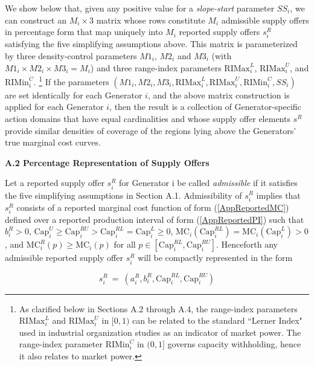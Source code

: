 \documentclass[12pt]{article}
\begin{document}
We show below that, given any positive value for a \textit{slope-start\/} parameter $SS_i$, we can construct 
an $M_i\times 3$ matrix whose rows constitute $M_i$ admissible supply offers in percentage form that map 
uniquely into $M_i$ reported supply offers $s^R_i$ satisfying the five simplifying assumptions above.  This matrix is parameterized by three density-control parameters $M1_i$, $M2_i$ and $M3_i$ (with $M1_i\times M2_i \times M3_i = M_i$) and three range-index parameters $\mbox{RIMax}^L_i$, $\mbox{RIMax}^U_i$, and $\mbox{RIMin}^C_i$.%
     \footnote{As clarified below in Sections A.2 through A.4, the range-index parameters $\mbox{RIMax}^L_i$  
and $\mbox{RIMax}^U_i$ in $[0,1)$ can be related to the standard ``Lerner Index" used in industrial organization studies as an indicator of market power.  The range-index parameter $\mbox{RIMin}^C_i$ in $(0,1]$ governs capacity withholding, hence it also relates to market power.} 
     If the parameters $(M1_i,M2_i,M3_i,\mbox{RIMax}^L_i,\mbox{RIMax}^U_i,\mbox{RIMin}^C_i,SS_i)$ are set identically for each Generator $i$, and the above matrix construction is applied for each Generator $i$, then the result is a collection of Generator-specific action domains that have equal cardinalities and whose supply offer elements $s^R$ provide similar densities of coverage of the regions lying above the Generators' true marginal cost curves.  


\bigskip
\noindent
\textbf{\large A.2 Percentage Representation of Supply Offers}

\medskip
\noindent

 
Let a reported supply offer $s^R_i$ for Generator i be called \textit{admissible\/} if it satisfies the five simplifying assumptions in Section A.1.  Admissibility of $s^R_i$ implies that $s^R_i$ consists of a reported marginal cost function of form (\ref{AppReportedMC}) defined over a reported production interval of form (\ref{AppReportedPI}) such that 
$b^R_i > 0$, 
$\mbox{Cap}^{U}_i \ge \mbox{Cap}^{RU}_i > \mbox{Cap}^{RL}_i = \mbox{Cap}^{L}_i \ge 0$, 
$\mbox{MC}_i(\mbox{Cap}^{RL}_i) = \mbox{MC}_i(\mbox{Cap}^{L}_i) > 0$,
and $\mbox{MC}^R_i(p) \ge \mbox{MC}_i(p)$ for all $p \in [\mbox{Cap}^{RL}_i,\mbox{Cap}^{RU}_i]$.  Henceforth any admissible reported supply offer $s^R_i$ will be compactly represented in the form

\begin{equation} \label{AppReportedSO}
	s_i^R ~= ~(a_i^R, b_i^R, \mbox{Cap}^{RL}_i, \mbox{Cap}_i^{RU}) 
\end{equation}
\end{document}

